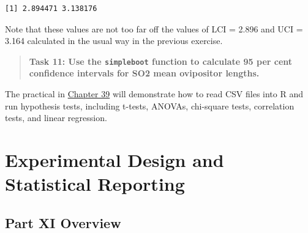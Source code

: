 \documentclass[
]{scrbook}
\begin{document}
\begin{verbatim}
[1] 2.894471 3.138176
\end{verbatim}

Note that these values are not too far off the values of LCI = 2.896 and UCI = 3.164 calculated in the usual way in the previous exercise.

\begin{quote}
\textbf{Task 11: Use the \texttt{simpleboot} function to calculate 95 per cent confidence intervals for SO2 mean ovipositor lengths.}
\end{quote}

The practical in \protect\hyperlink{Chapter_39}{Chapter 39} will demonstrate how to read CSV files into R and run hypothesis tests, including t-tests, ANOVAs, chi-square tests, correlation tests, and linear regression.

\hypertarget{part-experimental-design-and-statistical-reporting}{%
\part{Experimental Design and Statistical Reporting}\label{part-experimental-design-and-statistical-reporting}}

\hypertarget{Week12}{%
\chapter*{Part XI Overview}\label{Week12}}
\end{document}
